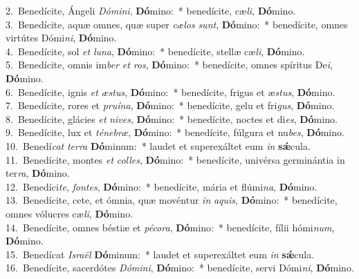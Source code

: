 {2.~}Benedícite, Ángeli \textit{Dó}\textit{mi}\textit{ni}, \textbf{Dó}mino:~* benedícite, cæ\textit{li}, \textbf{Dó}mino.\\
{3.~}Benedícite, aquæ omnes, quæ super \textit{cæ}\textit{los} \textit{sunt}, \textbf{Dó}mino:~* benedícite, omnes virtútes Dómi\textit{ni}, \textbf{Dó}mino.\\
{4.~}Benedícite, sol \textit{et} \textit{lu}\textit{na}, \textbf{Dó}mino:~* benedícite, stellæ cæ\textit{li}, \textbf{Dó}mino.\\
{5.~}Benedícite, omnis im\textit{ber} \textit{et} \textit{ros}, \textbf{Dó}mino:~* benedícite, omnes spíritus De\textit{i}, \textbf{Dó}mino.\\
{6.~}Benedícite, ignis \textit{et} \textit{æ}\textit{stus}, \textbf{Dó}mino:~* benedícite, frigus et æ\textit{stus}, \textbf{Dó}mino.\\
{7.~}Benedícite, rores et \textit{pru}\textit{í}\textit{na}, \textbf{Dó}mino:~* benedícite, gelu et fri\textit{gus}, \textbf{Dó}mino.\\
{8.~}Benedícite, glácies \textit{et} \textit{ni}\textit{ves}, \textbf{Dó}mino:~* benedícite, noctes et di\textit{es}, \textbf{Dó}mino.\\
{9.~}Benedícite, lux et \textit{té}\textit{ne}\textit{bræ}, \textbf{Dó}mino:~* benedícite, fúlgura et nu\textit{bes}, \textbf{Dó}mino.\\
{10.~}Benedí\textit{cat} \textit{ter}\textit{ra} \textbf{Dó}minum:~* laudet et superexáltet eum \textit{in} \textbf{sǽ}cula.\\
{11.~}Benedícite, montes \textit{et} \textit{col}\textit{les}, \textbf{Dó}mino:~* benedícite, univérsa germinántia in ter\textit{ra}, \textbf{Dó}mino.\\
{12.~}Benedíci\textit{te}, \textit{fon}\textit{tes}, \textbf{Dó}mino:~* benedícite, mária et flúmi\textit{na}, \textbf{Dó}mino.\\
{13.~}Benedícite, cete, et ómnia, quæ movéntur \textit{in} \textit{a}\textit{quis}, \textbf{Dó}mino:~* benedícite, omnes vólucres cæ\textit{li}, \textbf{Dó}mino.\\
{14.~}Benedícite, omnes béstiæ et \textit{pé}\textit{co}\textit{ra}, \textbf{Dó}mino:~* benedícite, fílii hómi\textit{num}, \textbf{Dó}mino.\\
{15.~}Benedícat \textit{Is}\textit{ra}\textit{ël} \textbf{Dó}minum:~* laudet et superexáltet eum \textit{in} \textbf{sǽ}cula.\\
{16.~}Benedícite, sacerdótes \textit{Dó}\textit{mi}\textit{ni}, \textbf{Dó}mino:~* benedícite, servi Dómi\textit{ni}, \textbf{Dó}mino.\\
